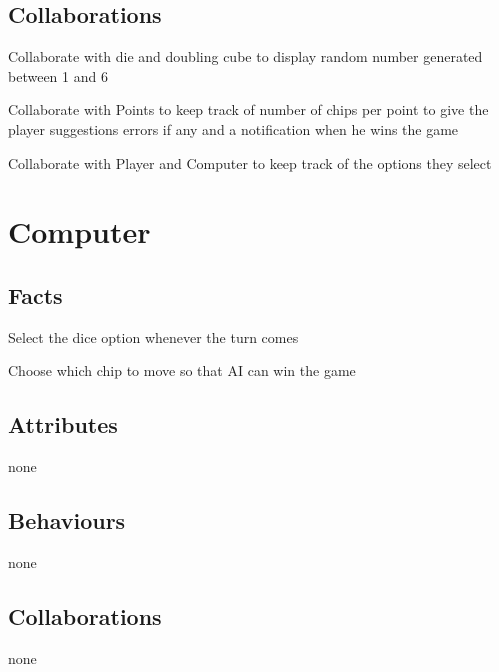 \documentclass{report}
\begin{document}
\subsection{Collaborations}

    \item Collaborate with die and doubling cube to display random number generated between 1 and 6
    \item Collaborate with Points to keep track of number of chips per point to give the player suggestions errors if any and a notification when he wins the game
    \item Collaborate with Player and Computer to keep track of the options they select

\section{Computer}

\subsection{Facts}

\begin{dashed}
    \item Select the dice option whenever the turn comes
    \item Choose which chip to move so that AI can win the game
\end{dashed}

\subsection{Attributes}

    \item none

\subsection{Behaviours}

    \item none

\subsection{Collaborations}

    \item none
\end{document}
